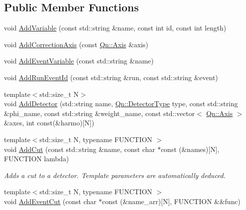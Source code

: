 \subsection*{Public Member Functions}
\begin{DoxyCompactItemize}
\item 
void \mbox{\hyperlink{classQn_1_1CorrectionManager_a3b2edd13dc55101b174f14a5239633ef}{Add\+Variable}} (const std\+::string \&name, const int id, const int length)
\item 
void \mbox{\hyperlink{classQn_1_1CorrectionManager_a70e2e9393902f02ca5d218425f5f6201}{Add\+Correction\+Axis}} (const \mbox{\hyperlink{classQn_1_1Axis}{Qn\+::\+Axis}} \&axis)
\item 
void \mbox{\hyperlink{classQn_1_1CorrectionManager_a90640b93699ad1550136bd53a5ef39f9}{Add\+Event\+Variable}} (const std\+::string \&name)
\item 
void \mbox{\hyperlink{classQn_1_1CorrectionManager_a858b828ce9b1db78c9429dfc89a3c2d6}{Add\+Run\+Event\+Id}} (const std\+::string \&run, const std\+::string \&event)
\item 
{\footnotesize template$<$std\+::size\+\_\+t N$>$ }\\void \mbox{\hyperlink{classQn_1_1CorrectionManager_a7b9b32033074f6bd3eacd3e51702dc7e}{Add\+Detector}} (std\+::string name, \mbox{\hyperlink{namespaceQn_adba56b19bd9207127cdc7227d9e03a05}{Qn\+::\+Detector\+Type}} type, const std\+::string \&phi\+\_\+name, const std\+::string \&weight\+\_\+name, const std\+::vector$<$ \mbox{\hyperlink{classQn_1_1Axis}{Qn\+::\+Axis}} $>$ \&axes, int const(\&harmo)\mbox{[}N\mbox{]})
\item 
{\footnotesize template$<$std\+::size\+\_\+t N, typename F\+U\+N\+C\+T\+I\+ON $>$ }\\void \mbox{\hyperlink{classQn_1_1CorrectionManager_a74b1dfe42a8480d852b0d76085c3cc1d}{Add\+Cut}} (const std\+::string \&name, const char $\ast$const (\&names)\mbox{[}N\mbox{]}, F\+U\+N\+C\+T\+I\+ON lambda)
\begin{DoxyCompactList}\small\item\em Adds a cut to a detector. Template parameters are automatically deduced. \end{DoxyCompactList}\item 
{\footnotesize template$<$std\+::size\+\_\+t N, typename F\+U\+N\+C\+T\+I\+ON $>$ }\\void \mbox{\hyperlink{classQn_1_1CorrectionManager_ad043483660dfc3b533f9bf9ca8272229}{Add\+Event\+Cut}} (const char $\ast$const (\&name\+\_\+arr)\mbox{[}N\mbox{]}, F\+U\+N\+C\+T\+I\+ON \&\&func)

\end{DoxyCompactItemize}
